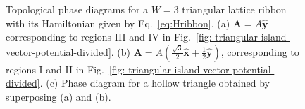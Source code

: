 \documentclass[aps,prb,showpacs,amsmath,twocolumn,amssymb,superscriptaddress]{revtex4-2}
\let\oldhat\hat
\renewcommand{\hat}[1]{\oldhat{\mathbf{#1}}}
\begin{document}
\begin{figure}[ht]
  \hfill
  \hfill
    \hfill
  \caption{Topological phase diagrams for a $W=3$ triangular lattice ribbon with its Hamiltonian given by Eq.~\eqref{eq:Hribbon}. (a) $\bm A = A\hat{y}$ corresponding to regions III and IV in Fig.~\ref{fig: triangular-island-vector-potential-divided}. (b) $\bm A = A(\frac{\sqrt{3}}{2}\hat{x}+\frac{1}{2}\hat{y})$, corresponding to regions I and II in Fig.~\ref{fig: triangular-island-vector-potential-divided}. (c) Phase diagram for a hollow triangle obtained by superposing (a) and (b).}
  \label{fig: majorana-number}
\end{figure}
\end{document}
